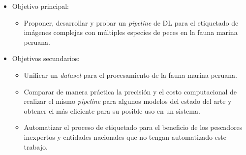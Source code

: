 \begin{itemize}
    \item { Objetivo principal: 
        \begin{itemize}
            \item Proponer, desarrollar y probar un 
                \textit{pipeline} de DL para el etiquetado de imágenes complejas 
                con múltiples especies de peces en la fauna marina peruana.
        \end{itemize}
     }
     \item { Objetivos secundarios:
        \begin{itemize}
            \item Unificar un \textit{dataset} para el procesamiento de la 
            fauna marina peruana.
            \item Comparar de manera práctica la precisión y el costo 
                computacional de realizar el mismo \textit{pipeline} para 
                algunos modelos del estado del arte y obtener el más 
                eficiente para su posible uso en un sistema. 
            \item Automatizar el proceso de etiquetado para el beneficio de 
                los pescadores inexpertos y entidades nacionales que no tengan 
                automatizado este trabajo.  
        \end{itemize}
        }
\end{itemize}